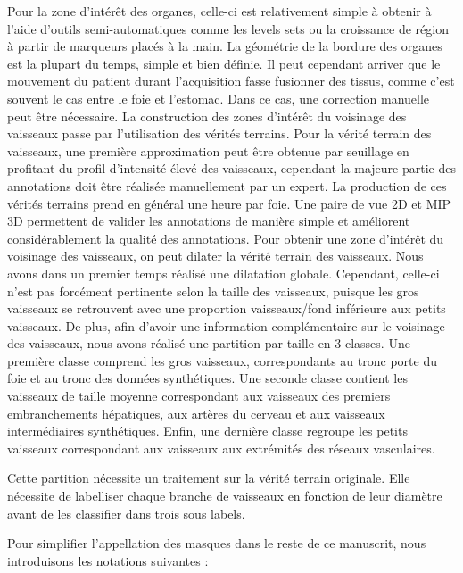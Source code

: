 Pour la zone d'intérêt des organes, celle-ci est relativement simple à obtenir à l'aide d'outils semi-automatiques comme les levels sets ou la croissance de région à partir de marqueurs placés à la main. La géométrie de la bordure des organes est la plupart du temps, simple et bien définie. Il peut cependant arriver que le mouvement du patient durant l'acquisition fasse fusionner des tissus, comme c'est souvent le cas entre le foie et l'estomac. Dans ce cas, une correction manuelle peut être nécessaire.
La construction des zones d'intérêt du voisinage des vaisseaux passe par l'utilisation des vérités terrains.
Pour la vérité terrain des vaisseaux, une première approximation peut être obtenue par seuillage en profitant du profil d'intensité élevé des vaisseaux, cependant la majeure partie des annotations doit être réalisée manuellement par un expert. La production de ces vérités terrains prend en général une heure par foie. Une paire de vue 2D et MIP 3D permettent de valider les annotations de manière simple et améliorent considérablement la qualité des annotations.
Pour obtenir une zone d'intérêt du voisinage des vaisseaux, on peut dilater la vérité terrain des vaisseaux. Nous avons dans un premier temps réalisé une dilatation globale. Cependant, celle-ci n'est pas forcément pertinente selon la taille des vaisseaux, puisque les gros vaisseaux se retrouvent avec une proportion vaisseaux/fond inférieure aux petits vaisseaux. De plus, afin d'avoir une information complémentaire sur le voisinage des vaisseaux, nous avons réalisé une partition par taille en 3 classes. Une première classe comprend les gros vaisseaux, correspondants au tronc porte du foie et au tronc des données synthétiques. Une seconde classe contient les vaisseaux de taille moyenne correspondant aux vaisseaux des premiers embranchements hépatiques, aux artères du cerveau et aux vaisseaux intermédiaires synthétiques. Enfin, une dernière classe regroupe les petits vaisseaux correspondant aux vaisseaux aux extrémités des réseaux vasculaires.

Cette partition nécessite un traitement sur la vérité terrain originale. Elle nécessite de labelliser chaque branche de vaisseaux en fonction de leur diamètre avant de les classifier dans trois sous labels.

Pour simplifier l'appellation des masques dans le reste de ce manuscrit, nous introduisons les notations suivantes :

